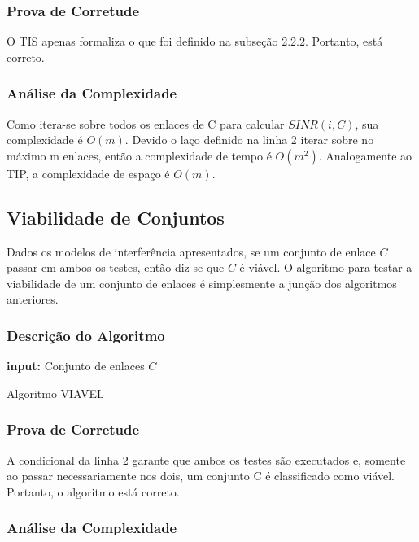 \subsubsection{Prova de Corretude}

O TIS apenas formaliza o que foi definido na subseção 2.2.2. Portanto, está correto.

\subsubsection{Análise da Complexidade}

Como itera-se sobre todos os enlaces de C para calcular $SINR(i,C)$, sua complexidade é $O(m)$. Devido o laço definido na linha 2 iterar sobre no máximo m enlaces, então a complexidade de tempo é $O(m^2)$. Analogamente ao TIP, a complexidade de espaço é $O(m)$.

\subsection{Viabilidade de Conjuntos}

Dados os modelos de interferência apresentados, se um conjunto de enlace $C$ passar em ambos os testes, então diz-se que $C$ é viável. O algoritmo para testar a viabilidade de um conjunto de enlaces é simplesmente a junção dos algoritmos anteriores.

\subsubsection{Descrição do Algoritmo}

\begin{algorithm}[h]
	\SetVline
	{\bf input:} Conjunto de enlaces $C$\\
\caption{Algoritmo VIAVEL}
\label{alg:viavel}
\end{algorithm}

\subsubsection{Prova de Corretude}

A condicional da linha 2 garante que ambos os testes são executados e, somente ao passar necessariamente nos dois, um conjunto C é classificado como viável. Portanto, o algoritmo está correto.

\subsubsection{Análise da Complexidade}

